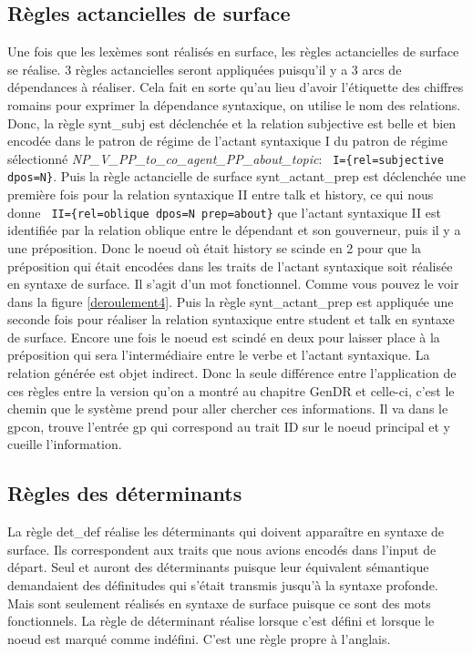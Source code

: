 \subsection{Règles actancielles de surface}
Une fois que les lexèmes sont réalisés en surface, les règles actancielles de surface se réalise. 3 règles actancielles seront appliquées puisqu'il y a 3 arcs de dépendances à réaliser. Cela fait en sorte qu'au lieu d'avoir l'étiquette des chiffres romains pour exprimer la dépendance syntaxique, on utilise le nom des relations. Donc, la règle synt\_subj est déclenchée et la relation subjective est belle et bien encodée dans le patron de régime de l'actant syntaxique I du patron de régime sélectionné \emph{NP\_V\_PP\_to\_co\_agent\_PP\_about\_topic}: \lstinline! I={rel=subjective dpos=N}!. Puis la règle actancielle de surface synt\_actant\_prep est déclenchée une première fois pour la relation syntaxique II entre talk et history, ce qui nous donne \lstinline! II={rel=oblique dpos=N prep=about}! que l'actant syntaxique II est identifiée par la relation oblique entre le dépendant et son gouverneur, puis il y a une préposition. Donc le noeud où était history se scinde en 2 pour que la préposition qui était encodées dans les traits de l'actant syntaxique soit réalisée en syntaxe de surface. Il s'agit d'un mot fonctionnel. Comme vous pouvez le voir dans la figure \ref{deroulement4}. Puis la règle synt\_actant\_prep est appliquée une seconde fois pour réaliser la relation syntaxique entre student et talk en syntaxe de surface. Encore une fois le noeud est scindé en deux pour laisser place à la préposition  qui sera l'intermédiaire entre le verbe et l'actant syntaxique. La relation générée est objet indirect. Donc la seule différence entre l'application de ces règles entre la version qu'on a montré au chapitre GenDR et celle-ci, c'est le chemin que le système prend pour aller chercher ces informations. Il va dans le gpcon, trouve l'entrée gp qui correspond au trait ID sur le noeud principal et y cueille l'information.

\subsection{Règles des déterminants}
La règle det\_def réalise les déterminants qui doivent apparaître en syntaxe de surface. Ils correspondent aux traits que nous avions encodés dans l'input de départ. Seul  et  auront des déterminants puisque leur équivalent sémantique demandaient des définitudes qui s'était transmis jusqu'à la syntaxe profonde. Mais sont seulement réalisés en syntaxe de surface puisque ce sont des mots fonctionnels. La règle de déterminant réalise  lorsque c'est défini et  lorsque le noeud est marqué comme indéfini. C'est une règle propre à l'anglais.

